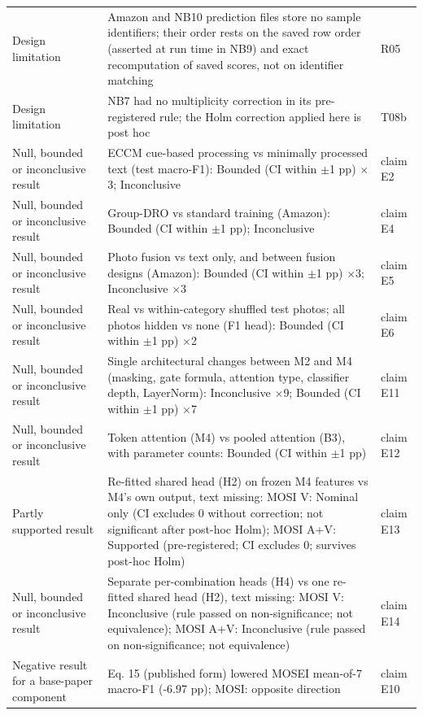 {\begin{xltabular}{\linewidth}{>{\raggedright\arraybackslash}X>{\raggedright\arraybackslash}X>{\raggedright\arraybackslash}X}
Design limitation & Amazon and NB10 prediction files store no sample identifiers; their order rests on the saved row order (asserted at run time in NB9) and exact recomputation of saved scores, not on identifier matching & R05 \\
Design limitation & NB7 had no multiplicity correction in its pre-registered rule; the Holm correction applied here is post hoc & T08b \\
Null, bounded or inconclusive result & ECCM cue-based processing vs minimally processed text (test macro-F1): Bounded (CI within $\pm$1 pp) $\times$3; Inconclusive & claim E2 \\
Null, bounded or inconclusive result & Group-DRO vs standard training (Amazon): Bounded (CI within $\pm$1 pp); Inconclusive & claim E4 \\
Null, bounded or inconclusive result & Photo fusion vs text only, and between fusion designs (Amazon): Bounded (CI within $\pm$1 pp) $\times$3; Inconclusive $\times$3 & claim E5 \\
Null, bounded or inconclusive result & Real vs within-category shuffled test photos; all photos hidden vs none (F1 head): Bounded (CI within $\pm$1 pp) $\times$2 & claim E6 \\
Null, bounded or inconclusive result & Single architectural changes between M2 and M4 (masking, gate formula, attention type, classifier depth, LayerNorm): Inconclusive $\times$9; Bounded (CI within $\pm$1 pp) $\times$7 & claim E11 \\
Null, bounded or inconclusive result & Token attention (M4) vs pooled attention (B3), with parameter counts: Bounded (CI within $\pm$1 pp) & claim E12 \\
Partly supported result & Re-fitted shared head (H2) on frozen M4 features vs M4's own output, text missing: MOSI V: Nominal only (CI excludes 0 without correction; not significant after post-hoc Holm); MOSI A+V: Supported (pre-registered; CI excludes 0; survives post-hoc Holm) & claim E13 \\
Null, bounded or inconclusive result & Separate per-combination heads (H4) vs one re-fitted shared head (H2), text missing: MOSI V: Inconclusive (rule passed on non-significance; not equivalence); MOSI A+V: Inconclusive (rule passed on non-significance; not equivalence) & claim E14 \\
Negative result for a base-paper component & Eq. 15 (published form) lowered MOSEI mean-of-7 macro-F1 (-6.97 pp); MOSI: opposite direction & claim E10 \\

\end{xltabular}}
